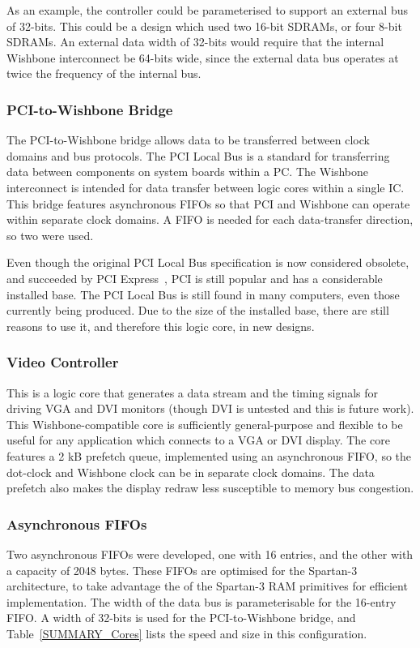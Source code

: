 As an example, the controller could be parameterised to support an external bus
of 32-bits. This could be a design which used two 16-bit SDRAMs, or four 8-bit
SDRAMs. An external data width of 32-bits would require that the internal
Wishbone interconnect be 64-bits wide, since the external data bus operates at
twice the frequency of the internal bus.


\subsubsection{PCI-to-Wishbone Bridge}
The PCI-to-Wishbone bridge allows data to be transferred between clock domains
and bus protocols. The PCI Local Bus is a standard for transferring data between
components on system boards within a PC. The Wishbone interconnect is intended
for data transfer between logic cores within a single IC. This bridge features
asynchronous FIFOs so that PCI and Wishbone can operate within separate clock
domains. A FIFO is needed for each data-transfer direction, so two were used.

Even though the original PCI Local Bus specification is now considered obsolete,
and succeeded by PCI Express~\cite{budruk2003pes}, PCI is still popular and has a
considerable installed base. The PCI Local Bus is still found in many computers,
even those currently being produced. Due to the size of the installed base, there
are still reasons to use it, and therefore this logic core, in new designs.


\subsubsection{Video Controller}
This is a logic core that generates a data stream and the timing signals for
driving VGA and DVI monitors (though DVI is untested and this is future work).
This Wishbone-compatible core is sufficiently general-purpose and flexible to be
useful for any application which connects to a VGA or DVI display. The core
features a 2 kB prefetch queue, implemented using an asynchronous FIFO, so the
dot-clock and Wishbone clock can be in separate clock domains. The data prefetch
also makes the display redraw less susceptible to memory bus congestion.


\subsubsection{Asynchronous FIFOs}
Two asynchronous FIFOs were developed, one with 16 entries, and the other with a
capacity of 2048 bytes. These FIFOs are optimised for the Spartan-3 architecture,
to take advantage the of the Spartan-3 RAM primitives for efficient
implementation. The width of the data bus is parameterisable for the 16-entry
FIFO. A width of 32-bits is used for the PCI-to-Wishbone bridge, and
Table~\ref{SUMMARY_Cores} lists the speed and size in this configuration.

